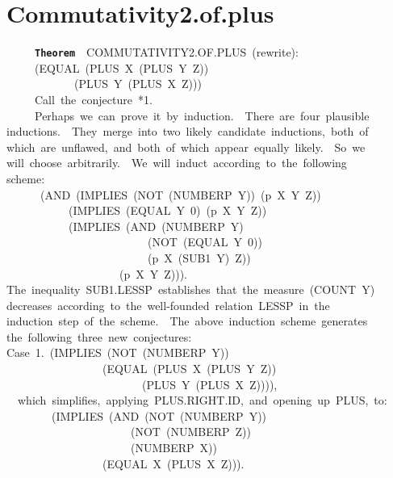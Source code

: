 \documentclass[11pt]{book}
\newenvironment{pubasis}{\begin{flushleft}\ttfamily\small}{\normalsize\rmfamily\end{flushleft}}
\newcommand{\axiomordefinition}[1]{\vspace{6pt}\texttt{\textbf{#1}}}
\newcommand{\pubdefaulttextsize}{\large}
\begin{document}
\section{Commutativity2.of.plus}
\pubdefaulttextsize
\begin{pubasis}
~~~~~\axiomordefinition{Theorem}~~COM\-MU\-TA\-TIV\-ITY2.OF.PLUS~(rewrite):\\
~~~~~(EQUAL~(PLUS~X~(PLUS~Y~Z))\\
~~~~~~~~~~~~(PLUS~Y~(PLUS~X~Z)))\\

~~~~~Call~the~conjecture~*1.\\

~~~~~Perhaps~we~can~prove~it~by~induction.~~There~are~four~plausible\\
inductions.~~They~merge~into~two~likely~candidate~inductions,~both~of\\
which~are~unflawed,~and~both~of~which~appear~equally~likely.~~So~we\\
will~choose~arbitrarily.~~We~will~induct~according~to~the~following\\
scheme:\\
~~~~~~(AND~(IMPLIES~(NOT~(NUMBERP~Y))~(p~X~Y~Z))\\
~~~~~~~~~~~(IMPLIES~(EQUAL~Y~0)~(p~X~Y~Z))\\
~~~~~~~~~~~(IMPLIES~(AND~(NUMBERP~Y)\\
~~~~~~~~~~~~~~~~~~~~~~~~~(NOT~(EQUAL~Y~0))\\
~~~~~~~~~~~~~~~~~~~~~~~~~(p~X~(SUB1~Y)~Z))\\
~~~~~~~~~~~~~~~~~~~~(p~X~Y~Z))).\\
The~inequality~SUB1.LESSP~establishes~that~the~measure~(COUNT~Y)\\
decreases~according~to~the~well-founded~relation~LESSP~in~the\\
induction~step~of~the~scheme.~~The~above~induction~scheme~generates\\
the~following~three~new~conjectures:\\

Case~1.~(IMPLIES~(NOT~(NUMBERP~Y))\\
~~~~~~~~~~~~~~~~~(EQUAL~(PLUS~X~(PLUS~Y~Z))\\
~~~~~~~~~~~~~~~~~~~~~~~~(PLUS~Y~(PLUS~X~Z)))),\\

~~which~simplifies,~applying~PLUS.RIGHT.ID,~and~opening~up~PLUS,~to:\\

~~~~~~~~(IMPLIES~(AND~(NOT~(NUMBERP~Y))\\
~~~~~~~~~~~~~~~~~~~~~~(NOT~(NUMBERP~Z))\\
~~~~~~~~~~~~~~~~~~~~~~(NUMBERP~X))\\
~~~~~~~~~~~~~~~~~(EQUAL~X~(PLUS~X~Z))).\\


\end{pubasis}
\end{document}

